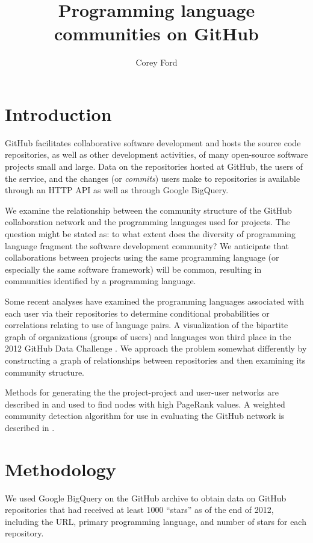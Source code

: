 \documentclass[twocolumn]{article}
\title{Programming language communities on GitHub}
\author{Corey Ford}
\begin{document}
\maketitle

\section{Introduction}

GitHub \cite{github} facilitates collaborative software development and hosts
the source code repositories, as well as other development activities, of many
open-source software projects small and large. Data on the repositories hosted
at GitHub, the users of the service, and the changes (or \textit{commits}) users
make to repositories is available through an HTTP API as well as through Google
BigQuery.

We examine the relationship between the community structure of the GitHub
collaboration network and the programming languages used for projects. The
question might be stated as: to what extent does the diversity of programming
language fragment the software development community? We anticipate that
collaborations between projects using the same programming language (or
especially the same software framework) will be common, resulting in communities
identified by a programming language.

Some recent analyses have examined the programming languages associated with each
user via their repositories to determine conditional probabilities \cite{doll12}
or correlations \cite{shah13} relating to use of language pairs. A visualization
of the bipartite graph of organizations (groups of users) and languages
\cite{rodrigues12} won third place in the 2012 GitHub Data Challenge . We
approach the problem somewhat differently by constructing a graph of
relationships between repositories and then examining its community structure.

Methods for generating the the project-project and user-user networks are
described in \cite{thung2013} and used to find nodes with high PageRank values.
A weighted community detection algorithm for use in evaluating the GitHub
network is described in \cite{marrama}.

\section{Methodology}
We used Google BigQuery on the GitHub archive to obtain data on GitHub
repositories that had received at least 1000 ``stars'' as of the end of 2012,
including the URL, primary programming language, and number of stars for each
repository.
\end{document}
